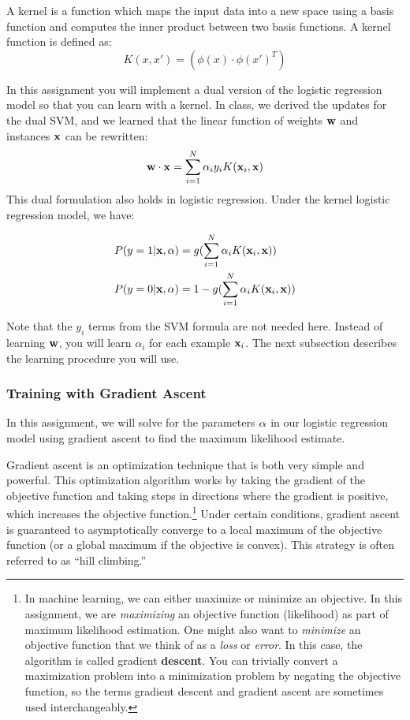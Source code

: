 \documentclass[11pt]{article}
\newcommand{\alphai}{\alpha_i}
\newcommand{\va}{{\bf \alpha}}
\newcommand{\vw}{{\bf w}}
\newcommand{\vx}{{\bf x}}
\newcommand{\vxi}{{\bf x}_i}
\newcommand{\yi}{y_i}
\begin{document}
A kernel is a function which maps the input data into a new space using a basis function and computes the inner product between two basis functions. A kernel function is defined as:
\[
K(x, x') = (\phi(x) \cdot \phi(x')^T)
\]

In this assignment you will implement a dual version of the logistic regression model so that you can learn with a kernel. 
In class, we derived the updates for the dual SVM, and we learned that the linear function of weights $\vw$ and instances $\vx$ can be rewritten:
\[
\vw \cdot \vx = \sum_{i=1}^N \alpha_i \yi K(\vxi, \vx)
\]
This dual formulation also holds in logistic regression. Under the kernel logistic regression model, we have:

\begin{align}
P(y=1 | \vx, \va) &  =   g(\sum_{i=1}^N \alpha_i K(\vxi, \vx)) \\
P(y=0 | \vx, \va) & =   1 - g(\sum_{i=1}^N \alpha_i K(\vxi, \vx))
\end{align}

Note that the $\yi$ terms from the SVM formula are not needed here.
Instead of learning $\vw$, you will learn $\alphai$ for each example $\vxi$. The next subsection describes the learning procedure you will use.

\subsubsection{Training with Gradient Ascent}

In this assignment, we will solve for the parameters $\va$ in our logistic regression model using gradient ascent to find the maximum likelihood estimate.

Gradient ascent is an optimization technique that is both very simple and powerful. This optimization algorithm works by taking the gradient of the objective function and taking steps in directions where the gradient is positive, which increases the objective function.\footnote{In machine learning, we can either maximize or minimize an objective. In this assignment, we are {\em maximizing} an objective function (likelihood) as part of maximum likelihood estimation. One might also want to {\em minimize} an objective function that we think of as a {\em loss} or {\em error}. In this case, the algorithm is called gradient {\bf descent}. You can trivially convert a maximization problem into a minimization problem by negating the objective function, so the terms gradient descent and gradient ascent are sometimes used interchangeably.}
Under certain conditions, gradient ascent is guaranteed to asymptotically converge to a local maximum of the objective function (or a global maximum if the objective is convex). This strategy is often referred to as ``hill climbing.''
\end{document}
